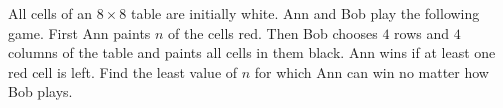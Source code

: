 All cells of an $8\times8$ table are initially white. Ann and Bob play the following game. First Ann paints $n$ of the cells red. Then Bob chooses $4$ rows and $4$ columns of the table and paints all cells in them black. Ann wins if at least one red cell is left. Find the least value of $n$ for which Ann can win no matter how Bob plays.
